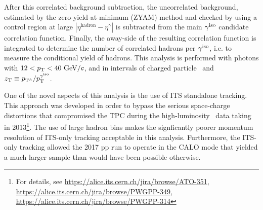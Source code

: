After this correlated background subtraction, the uncorrelated background, estimated by the zero-yield-at-minimum (ZYAM) method \cite{Sickles2010} and checked by using a control region at large $|\eta^{\mathrm{hadron}}-\eta^{\gamma}|$ is subtracted from the main $\gamma^\mathrm{iso}$ candidate correlation function. Finally, the away-side of the resulting correlation function is integrated to determine the number of correlated hadrons per $\gamma^\mathrm{iso}$, i.e. to measure the conditional yield of hadrons. This analysis is performed with photons with $12<p_{\mathrm{T}} <40~\mathrm{GeV}/c$, and in intervals of charged particle \pt~and $z_{\mathrm{T}} \equiv p_{\mathrm{T}^h}/p_{\mathrm{T}}^{\mathrm{\gamma^\mathrm{iso}}}$. 



One of the novel aspects of this analysis is the use of ITS standalone tracking. This approach was developed in order to bypass the serious space-charge distortions that compromised the TPC during the high-luminosity \pPb~data taking in 2013\footnote{For details, see \url{https://alice.its.cern.ch/jira/browse/ATO-351}, \url{https://alice.its.cern.ch/jira/browse/PWGPP-349},
\url{https://alice.its.cern.ch/jira/browse/PWGPP-314}
}.  The use of large hadron \pt bins makes the signficantly poorer momentum resolution of ITS-only tracking acceptable in this analysis. Furthermore, the ITS-only tracking allowed the 2017 pp run to operate in the CALO mode that yielded a much larger sample than would have been possible otherwise. 

